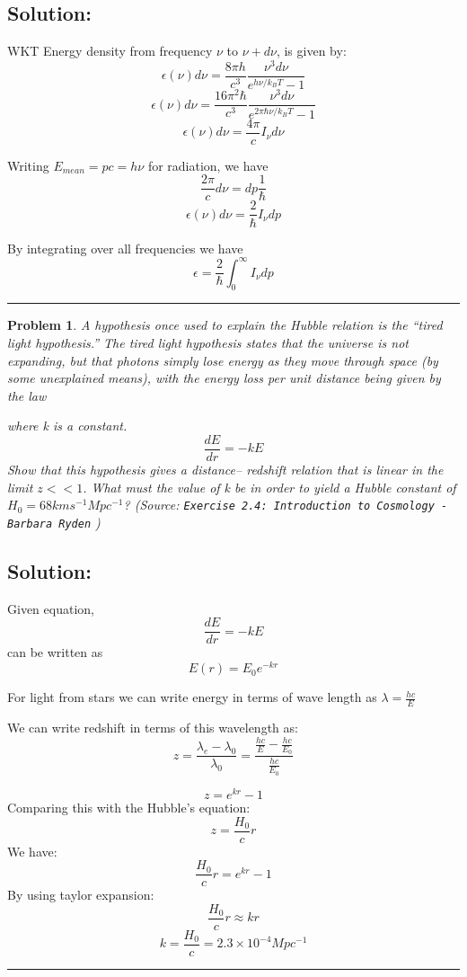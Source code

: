 \documentclass[11pt]{article}
\newenvironment{solution}{\subsection*{Solution:}}{\vspace{0.5cm} \hrule \vspace{0.7cm}}
\newtheorem{problem}{Problem}
\begin{document}
\begin{solution}
	WKT Energy density from frequency $\nu$ to $\nu+d\nu$, is given by:
	$$ \epsilon(\nu)d\nu = \frac{8\pi h}{c^3}\frac{\nu^3d\nu}{e^{h\nu/k_BT} - 1} $$
	$$ \epsilon(\nu) d\nu= \frac{16\pi^2\hbar}{c^3}\frac{\nu^3d\nu}{e^{2\pi
	\hbar \nu/k_BT} - 1} $$
	$$ \epsilon(\nu) d\nu= \frac{4\pi}{c} I_\nu d\nu$$

	Writing $E_{mean} = pc = h\nu$ for radiation, we have
	$$\frac{2\pi}{c} d\nu = dp \frac{1}{\hbar} $$
	$$ \epsilon(\nu) d\nu= \frac{2}{\hbar} I_\nu dp$$

	By integrating over all frequencies we have
	$$ \epsilon = \frac{2}{\hbar} \int_{0}^{\infty} I_\nu dp$$

\end{solution}

\begin{problem}
	A hypothesis once used to explain the Hubble relation is the “tired
	light
	hypothesis.” The tired light hypothesis states that the universe is not
	expanding, but that photons simply lose energy as they move through
	space (by some unexplained means), with the energy loss per unit
	distance being given by the law

	where k is a constant.
	$$ \frac{dE}{dr} = -kE $$
	Show that this hypothesis gives a distance–
	redshift relation that is linear in the limit $z <<1$. What must the value
	of
	k be in order to yield a Hubble constant of $H_0 = 68 km s^{-1} Mpc^{-1}$?
	(Source: \texttt{Exercise 2.4: Introduction to Cosmology - Barbara Ryden} )

\end{problem}


\begin{solution}
	Given equation,
	$$ \frac{dE}{dr} = -kE $$
	can be written as
	$$ E(r) = E_0 e^{-kr} $$

	For light from stars we can write energy in terms of wave length as
	$\lambda  = \frac{hc}{E}$

	We can write redshift in terms of this wavelength as:
	$$ z = \frac{\lambda_e - \lambda_0}{ \lambda_0 } = \frac{\frac{hc}{E} -
	\frac{hc}{E_0}}{ \frac{hc}{E_0}}$$

	$$ z = e^{kr} - 1 $$
	Comparing this with the Hubble's equation:
	$$ z = \frac{H_0}{c} r  $$
	We have:
	$$ \frac{H_0}{c}r = e^{kr} - 1 $$
	By using taylor expansion:
	$$ \frac{H_0}{c}r \approx kr $$
	$$ k = \frac{H_0}{c} = 2.3 \times 10^{-4} Mpc^{-1}$$

\end{solution}
\end{document}
